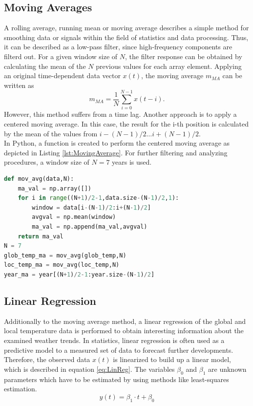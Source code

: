 \documentclass[a4paper]{article}
\begin{document}
\subsection{Moving Averages}
A rolling average, running mean or moving average describes a simple method for smoothing data or signals within the field of statistics and data processing. Thus, it can be described as a low-pass filter, since high-frequency components are filterd out. For a given window size of $N$, the filter response can be obtained by calculating the mean of the $N$ previous values for each array element. Applying an original time-dependent data vector $x(t)$, the moving average $m_{MA}$ can be written as
\begin{equation}
m_{MA}=\frac{1}{N}\sum^{N-1}_{i=0} x(t-i).
\end{equation}
However, this method suffers from a time lag. Another approach is to apply a centered moving average. In this case, the result for the i-th position is calculated by the mean of the values from $i-(N-1)/2 \dots i+(N-1)/2$.\\
In Python, a function is created to perform the centered moving average as depicted in Listing \ref{lst:MovingAverage}. For further filtering and analyzing procedures, a window size of $N=7$ years is used.
\begin{lstlisting}[language=python,caption={Defining and Applying a function for the centered moving average},label=lst:MovingAverage]
def mov_avg(data,N):
    ma_val = np.array([])
    for i in range((N+1)/2-1,data.size-(N-1)/2,1):
        window = data[i-(N-1)/2:i+(N-1)/2]
        avgval = np.mean(window)
        ma_val = np.append(ma_val,avgval)
    return ma_val
N = 7
glob_temp_ma = mov_avg(glob_temp,N)
loc_temp_ma = mov_avg(loc_temp,N)
year_ma = year[(N+1)/2-1:year.size-(N-1)/2]
\end{lstlisting}

\subsection{Linear Regression}
Additionally to the moving average method, a linear regression of the global and local temperature data is performed to obtain interesting information about the examined weather trends. In statistics, linear regression is often used as a predictive model to a measured set of data to forecast further developments. Therefore, the observed data $x(t)$ is linearized to build up a linear model, which is described in equation \ref{eq:LinReg}. The variables $\beta_0$ and $\beta_1$ are unknown parameters which have to be estimated by using methods like least-squares estimation.
\begin{equation}
y(t) = \beta_1\cdot t + \beta_0
\label{eq:LinReg}
\end{equation}  
\end{document}
